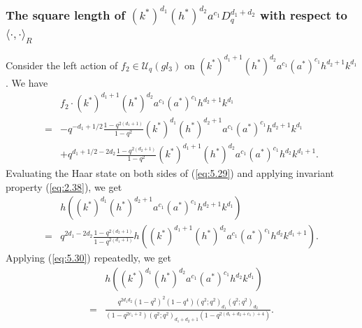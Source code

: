 \documentclass[table,a4paper,reqno]{amsart}
\numberwithin{equation}{section}
\theoremstyle{definition}
\begin{document}
\subsubsection{The square length of $(k^*)^{d_1}(h^*)^{d_2}a^{c_1}D_q^{d_1+d_2}$ with respect to $\langle \cdot,\cdot\rangle_R$}
Consider the left action of $f_2\in\mathcal{U}_q(gl_3)$ on $(k^*)^{d_1+1}(h^*)^{d_2}a^{c_1}(a^*)^{c_1}h^{d_2+1}k^{d_1}$. We have
\begin{equation}\label{eq:5.29}
    \begin{split}
        &f_2\cdot (k^*)^{d_1+1}(h^*)^{d_2}a^{c_1}(a^*)^{c_1}h^{d_2+1}k^{d_1}\\
        =&-q^{-d_1+1/2}\frac{1-q^{2(d_1+1)}}{1-q^2}(k^*)^{d_1}(h^*)^{d_2+1}a^{c_1}(a^*)^{c_1}h^{d_2+1}k^{d_1}\\
        &+q^{d_1+1/2-2d_2}\frac{1-q^{2(d_2+1)}}{1-q^2}(k^*)^{d_1+1}(h^*)^{d_2}a^{c_1}(a^*)^{c_1}h^{d_2}k^{d_1+1}.
    \end{split}
\end{equation}
Evaluating the Haar state on both sides of (\ref{eq:5.29}) and applying invariant property (\ref{eq:2.38}), we get
\begin{equation}\label{eq:5.30}
    \begin{split}
        &h\left((k^*)^{d_1}(h^*)^{d_2+1}a^{c_1}(a^*)^{c_1}h^{d_2+1}k^{d_1}\right)\\
        =&q^{2d_1-2d_2}\frac{1-q^{2(d_2+1)}}{1-q^{2(d_1+1)}}h\left((k^*)^{d_1+1}(h^*)^{d_2}a^{c_1}(a^*)^{c_1}h^{d_2}k^{d_1+1}\right).
    \end{split}
\end{equation}
Applying (\ref{eq:5.30}) repeatedly, we get
\begin{equation}\label{eq:5.31}
    \begin{split}
         &h\left((k^*)^{d_1}(h^*)^{d_2}a^{c_1}(a^*)^{c_1}h^{d_2}k^{d_1}\right)\\
         =&\frac{q^{2d_1d_2}(1-q^2)^2(1-q^4)(q^2;q^2)_{d_1}(q^2;q^2)_{d_2}}{(1-q^{2c_1+2})(q^2;q^2)_{d_1+d_2+1}(1-q^{2(d_1+d_2+c_1)+4})}.
    \end{split}
\end{equation}
\end{document}
